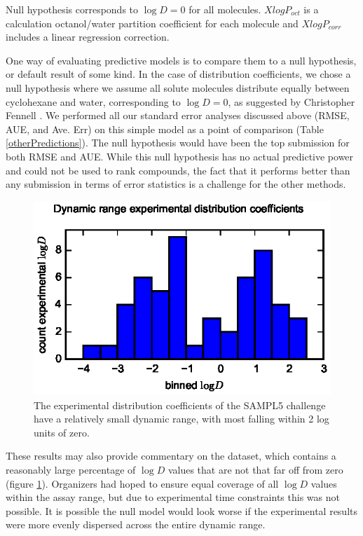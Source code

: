 \label{results:3}
\begin{table}
\footnotesize

\label{otherPredictions}
\caption{Null hypothesis corresponds to $\log D = 0$ for all molecules. $XlogP_{oct}$ is a calculation octanol/water partition coefficient for each molecule and $XlogP_{corr}$ includes a linear regression correction.} 
\end{table}
One way of evaluating predictive models is to compare them to a null hypothesis, or default result of some kind.  
In the case of distribution coefficients, we chose a null hypothesis where we assume all solute molecules distribute equally between cyclohexane and water, corresponding to $\log D = 0$, as suggested by Christopher Fennell  \cite{ChrisFennell:sampl5pc}. 
We performed all our standard error analyses discussed above (RMSE, AUE, and Ave. Err) on this simple model as a point of comparison (Table \ref{otherPredictions}). 
The null hypothesis would have been the top submission for both RMSE and AUE. 
While this null hypothesis has no actual predictive power and could not be used to rank compounds, the fact that it performs better than any submission in terms of error statistics is a challenge for the other methods. 
\begin{figure} 
\includegraphics{dynamicRange.eps}
\caption{The experimental distribution coefficients of the SAMPL5 challenge have a relatively small dynamic range, with most falling within 2 log units of zero.}
\label{dynamicRange}      
\end{figure}
These results may also provide commentary on the dataset, which contains a reasonably large percentage of $\log D$ values that are not that far off from zero (figure \ref{dynamicRange}).
Organizers had hoped to ensure equal coverage of all $\log D$ values within the assay range, but due to experimental time constraints this was not possible. 
It is possible the null model would look worse if the experimental results were more evenly dispersed across the entire dynamic range. 

